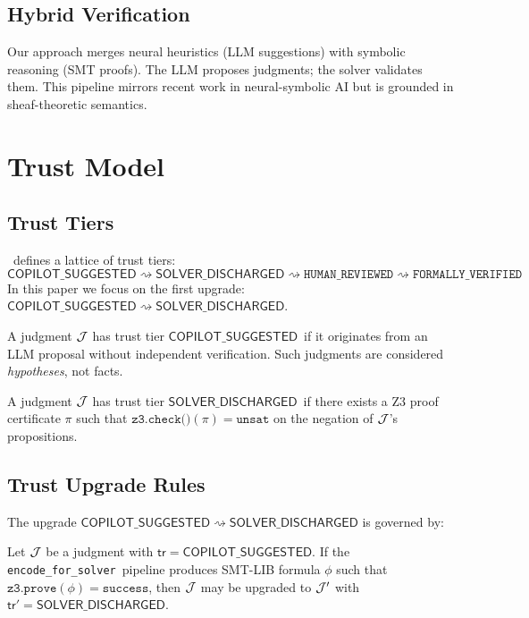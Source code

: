 \documentclass[11pt]{article}
\newcommand{\CopilotSugg}{\ensuremath{\mathsf{COPILOT\_SUGGESTED}}}
\newcommand{\SolverDisch}{\ensuremath{\mathsf{SOLVER\_DISCHARGED}}}
\newcommand{\TrustUpgrade}{\rightsquigarrow}
\newcommand{\tr}{\mathsf{tr}}                        %
\newcommand{\EncodeForSolver}{\texttt{encode\_for\_solver}}
\begin{document}
\subsection{Hybrid Verification}
Our approach merges neural heuristics (LLM suggestions) with symbolic 
reasoning (SMT proofs). The LLM proposes judgments; the solver validates 
them. This pipeline mirrors recent work in neural-symbolic AI but is grounded 
in sheaf-theoretic semantics.

\section{Trust Model}\label{sec:trust-model}

\subsection{Trust Tiers}
\JuGeo\ defines a lattice of trust tiers:
\[
  \CopilotSugg \TrustUpgrade \SolverDisch \TrustUpgrade \texttt{HUMAN\_REVIEWED} 
  \TrustUpgrade \texttt{FORMALLY\_VERIFIED}
\]
In this paper we focus on the first upgrade: $\CopilotSugg \TrustUpgrade 
\SolverDisch$.

\begin{definition}\label{def:copilot-suggested}
A judgment $\mathcal{J}$ has trust tier \CopilotSugg\ if it originates from an LLM 
proposal without independent verification. Such judgments are considered 
\emph{hypotheses}, not facts.
\end{definition}

\begin{definition}\label{def:solver-discharged}
A judgment $\mathcal{J}$ has trust tier \SolverDisch\ if there exists a Z3 proof 
certificate $\pi$ such that $\texttt{z3.check()}(\pi) = \texttt{unsat}$ on 
the negation of $\mathcal{J}$'s propositions.
\end{definition}

\subsection{Trust Upgrade Rules}
The upgrade $\CopilotSugg \TrustUpgrade \SolverDisch$ is governed by:

\begin{theorem}\label{thm:trust-promotion}
Let $\mathcal{J}$ be a judgment with $\tr = \CopilotSugg$. If the \EncodeForSolver\ 
pipeline produces SMT-LIB formula $\phi$ such that $\texttt{z3.prove}(\phi) = 
\texttt{success}$, then $\mathcal{J}$ may be upgraded to $\mathcal{J}'$ with $\tr' = 
\SolverDisch$.
\end{theorem}
\end{document}
